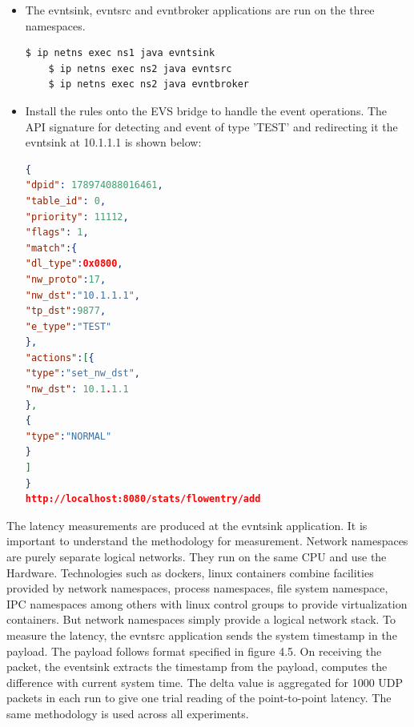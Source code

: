 \begin{itemize}
	\item The evntsink, evntsrc and evntbroker applications are run on the three namespaces.
	\begin{lstlisting}[language=bash]
	$ ip netns exec ns1 java evntsink
	$ ip netns exec ns2 java evntsrc
	$ ip netns exec ns2 java evntbroker \end{lstlisting}
\end{itemize}

\begin{itemize}
	\item Install the rules onto the EVS bridge to handle the event operations. The API signature for detecting and event of type 'TEST' and redirecting it the evntsink at 10.1.1.1 is shown below:
\begin{lstlisting}[language=json,firstnumber=1]
 {
"dpid": 178974088016461,
"table_id": 0,
"priority": 11112,
"flags": 1,
"match":{
"dl_type":0x0800,
"nw_proto":17,
"nw_dst":"10.1.1.1",
"tp_dst":9877,
"e_type":"TEST"
},
"actions":[{
"type":"set_nw_dst",
"nw_dst": 10.1.1.1
},
{
"type":"NORMAL"
}
]
}
http://localhost:8080/stats/flowentry/add \end{lstlisting}
\end{itemize}

The latency measurements are produced at the evntsink application. It is important to understand the methodology for measurement. Network namespaces are purely separate logical networks. They run on the same CPU and use the Hardware. Technologies such as dockers, linux containers combine facilities provided by network namespaces, process namespaces, file system namespace, IPC namespaces among others with linux control groups to provide virtualization containers. But network namespaces simply provide a logical network stack. To measure the latency, the evntsrc application sends the system timestamp in the payload. The payload follows format specified in figure 4.5. On receiving the packet, the eventsink extracts the timestamp from the payload, computes the difference with current system time. The delta value is aggregated for 1000 UDP packets in each run to give one trial reading of the point-to-point latency. The same methodology is used across all experiments.

